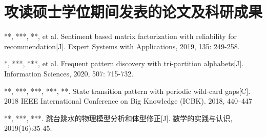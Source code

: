 \chapter{攻读硕士学位期间发表的论文及科研成果}
\begin{enumerate}[label={[}\arabic*{]}, labelindent=0.5em, leftmargin=2.65em, labelsep=1em]
    \item ***, ***, **, et al. Sentiment based matrix factorization with reliability for recommendation[J]. Expert Systems with Applications, 2019, 135: 249-258.
    \item **, ***, ***, et al. Frequent pattern discovery with tri-partition alphabets[J]. Information Sciences, 2020, 507: 715-732.
    \item ***, ***, ***, ***, **. State transition pattern with periodic wild-card gaps[C]. 2018 IEEE International Conference on Big Knowledge (ICBK). 2018, 440–447
    \item ***, ***, ***. 跳台跳水的物理模型分析和体型修正[J]. 数学的实践与认识, 2019(16):35-45.
\end{enumerate}